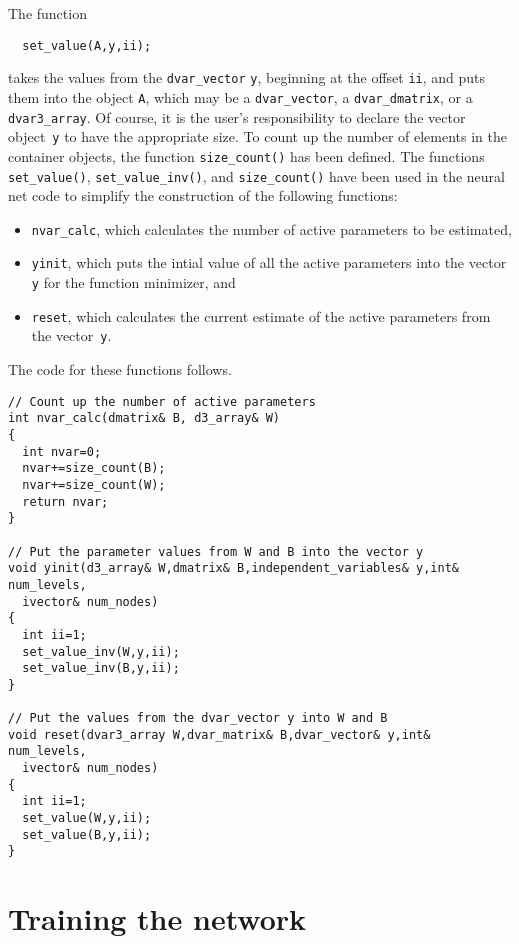 \documentclass{admbmanual}
\begin{document}
The function
\begin{lstlisting}
  set_value(A,y,ii);
\end{lstlisting}
takes the values from the \texttt{dvar\_vector} \texttt{y}, beginning
at the offset \texttt{ii}, and
puts them into the object \texttt{A}, which may be a \texttt{dvar\_vector}, a \texttt{dvar\_dmatrix}, or a
\texttt{dvar3\_array}. Of course, it is the user's responsibility to declare the
vector object~\texttt{y} to have the appropriate size.
To count up the number of elements in the container objects, the
function \texttt{size\_count()} has been defined.
The functions \texttt{set\_value()}, \texttt{set\_value\_inv()}, and 
\texttt{size\_count()} have been used in the neural net code 
to simplify the construction of the following functions:
\begin{itemize}
\item \texttt{nvar\_calc}, which calculates the
number of active parameters to be estimated,

\item \texttt{yinit}, which puts the
intial value of all the active parameters into the vector \texttt{y} for
the function minimizer, and 

\item \texttt{reset}, which calculates 
the current estimate of the active 
parameters from the vector~\texttt{y}. 
\end{itemize}
The code for these functions follows.
\begin{lstlisting}
// Count up the number of active parameters
int nvar_calc(dmatrix& B, d3_array& W)
{
  int nvar=0;
  nvar+=size_count(B);
  nvar+=size_count(W);
  return nvar;
}

// Put the parameter values from W and B into the vector y
void yinit(d3_array& W,dmatrix& B,independent_variables& y,int& num_levels,
  ivector& num_nodes)
{
  int ii=1;
  set_value_inv(W,y,ii);
  set_value_inv(B,y,ii);
}

// Put the values from the dvar_vector y into W and B
void reset(dvar3_array W,dvar_matrix& B,dvar_vector& y,int& num_levels,
  ivector& num_nodes)
{
  int ii=1;
  set_value(W,y,ii);
  set_value(B,y,ii);
}
\end{lstlisting}


\section{Training the network}
  
\end{document}

